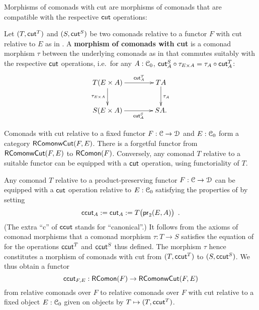 \documentclass[a4paper,USenglish]{lipics}
\newcommand{\fat}[1]{\textbf{#1}}
\begin{document}
\noindent
Morphisms of comonads with cut are morphisms of comonads that are compatible with the respective $\cut$ operations:

\begin{defn}%
\label{def:morphism_comonad_cut}
 Let $(T,\cut^T)$ and $(S,\cut^S)$ be two comonads relative to a functor $F$ with cut relative to $E$ as in .
 A \fat{morphism of comonads with cut} is a comonad morphism $\tau$ between the underlying comonads as in  that 
 commutes suitably with the respective $\cut$ operations, i.e.\ for any $A : \C_0$,
  $\comp{\tau_{E \times A}}{\cut^S_A}  = \comp{\cut^T_A}{\tau_A}$:
\[
 \begin{xy}
  \xymatrix@C=4em{
                 T(E\times A)   \ar[r]^-{\cut^T_A} \ar[d]_{\tau_{E \times A}}  & TA \ar[d]^{\tau_{A}}\\
                 S(E \times A)  \ar[r]_-{\cut^S_A}   & S A.
  }
 \end{xy}
\]

\end{defn}


Comonads with cut relative to a fixed functor $F:\C\to\D$ and $E:\C_0$ form a category $\RComonadWC(F,E)$.
There is a forgetful functor from $\RComonadWC(F,E)$ to $\RComonad(F)$.
Conversely, any comonad $T$ relative to a suitable functor can be equipped with a $\cut$ operation, using functoriality of $T$.
%

\begin{rem}\label{canonical_cut}
 Any comonad $T$ relative to a product-preserving functor $F:\C\to\D$  can be equipped with a $\cut$ operation relative to 
 $E:\C_0$ satisfying the properties of  by setting
   \[ \ccut_A := \cut_A := T\bigl(\pr_2(E,A)\bigr) \enspace . \]
 (The extra \enquote{c} of $\ccut$ stands for \enquote{canonical}.)
 It follows from the axioms of comonad morphisms that a comonad morphism $\tau : T\to S$ satisfies the equation of  
 for the  operations $\ccut^T$ and $\ccut^S$ thus defined. The morphism $\tau$ hence constitutes a morphism of comonads with cut from $(T,\ccut^T)$ to $(S,\ccut^S)$.
 We thus obtain a functor 
 \[ \ccut_{F,E} : \RComonad(F) \to \RComonadWC(F,E)\]
 from relative comonads over $F$ to relative comonads over $F$ with cut relative to a fixed object $E:\C_0$ given on 
 objects by $T\mapsto (T,\ccut^T)$.
\end{rem}
\end{document}
